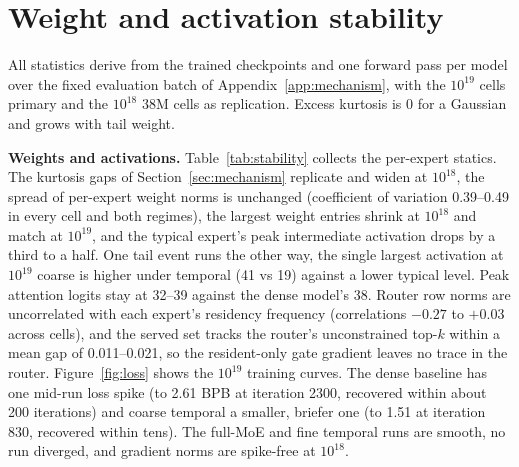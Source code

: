 \documentclass{article}
\begin{document}
\section{Weight and activation stability}\label{app:stability}

All statistics derive from the trained checkpoints and one forward pass per model over the
fixed evaluation batch of Appendix~\ref{app:mechanism}, with the $10^{19}$ cells primary and
the $10^{18}$ 38M cells as replication. Excess kurtosis is 0 for a Gaussian and grows with
tail weight.

\textbf{Weights and activations.} Table~\ref{tab:stability} collects the per-expert statics.
The kurtosis gaps of Section~\ref{sec:mechanism} replicate and widen at $10^{18}$, the spread
of per-expert weight norms is unchanged (coefficient of variation 0.39--0.49 in every cell and
both regimes), the largest weight entries shrink at $10^{18}$ and match at $10^{19}$, and the
typical expert's peak intermediate activation drops by a third to a half. One tail event runs
the other way, the single largest activation at $10^{19}$ coarse is higher under temporal (41
vs 19) against a lower typical level. Peak attention logits stay at 32--39 against the dense
model's 38. Router row norms are uncorrelated with each expert's residency frequency
(correlations $-0.27$ to $+0.03$ across cells), and the served set tracks the router's
unconstrained top-$k$ within a mean gap of 0.011--0.021, so the resident-only gate gradient
leaves no trace in the router. Figure~\ref{fig:loss} shows the $10^{19}$ training
curves. The dense baseline has one mid-run loss spike (to 2.61 BPB at iteration 2300, recovered
within about 200 iterations) and coarse temporal a smaller, briefer one (to 1.51 at iteration
830, recovered within tens). The full-MoE and fine temporal runs are smooth, no run diverged,
and gradient norms are spike-free at $10^{18}$.
\end{document}
